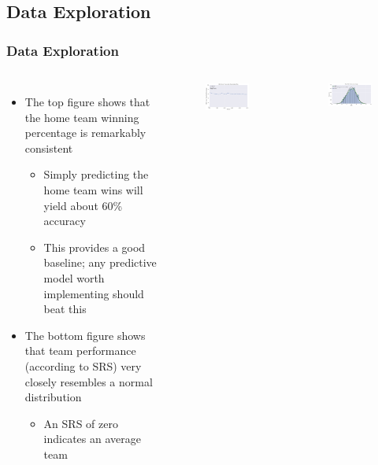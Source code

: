 \documentclass{beamer}
\begin{document}
\subsection{Data Exploration}
\begin{frame}
\frametitle{Data Exploration}
\begin{columns}
\begin{itemize}
    \item The top figure shows that the home team winning percentage is remarkably consistent
    \begin{itemize}
        \item Simply predicting the home team wins will yield about 60\% accuracy
        \item This provides a good baseline; any predictive model worth implementing should beat this
    \end{itemize}
    \item The bottom figure shows that team performance (according to SRS) very closely resembles a normal distribution
    \begin{itemize}
        \item An SRS of zero indicates an average team
    \end{itemize}
\end{itemize}
\vspace{-0.5cm}
\begin{figure}
\includegraphics[width=60mm]{../docs/assets/images/data-exploration/home-win-pct.png}
\end{figure}
\vspace{-0.5cm}
\begin{figure}
\includegraphics[width=60mm]{../docs/assets/images/data-exploration/srs-distribution.png}
\end{figure}
\end{columns}
\end{frame}
\end{document}
